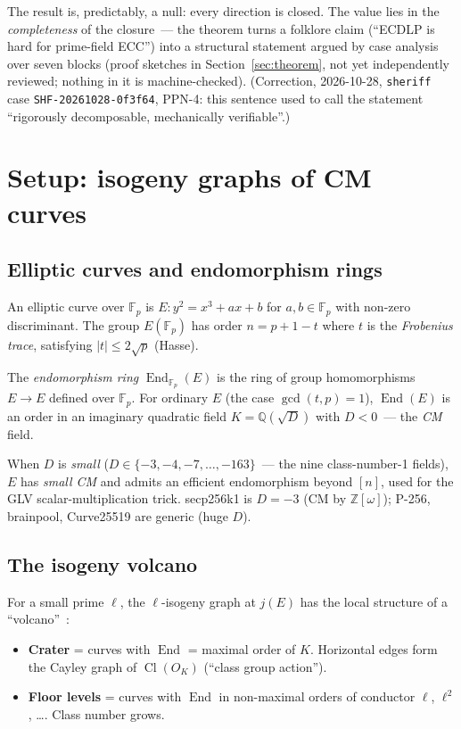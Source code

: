 \documentclass[11pt,a4paper]{article}
\theoremstyle{definition}
\newcommand{\FF}{\mathbb{F}}
\newcommand{\ZZ}{\mathbb{Z}}
\newcommand{\QQ}{\mathbb{Q}}
\newcommand{\End}{\operatorname{End}}
\newcommand{\Cl}{\operatorname{Cl}}
\renewcommand{\gcd}{\operatorname{gcd}}
\begin{document}
The result is, predictably, a null: every direction is closed.
The value lies in the \emph{completeness} of the closure~--- the
theorem turns a folklore claim (``ECDLP is hard for prime-field
ECC'') into a structural statement argued by case analysis over seven
blocks (proof sketches in Section~\ref{sec:theorem}, not yet
independently reviewed; nothing in it is machine-checked).
(Correction, 2026-10-28, \texttt{sheriff} case
\texttt{SHF-20261028-0f3f64}, PPN-4: this sentence used to call the
statement ``rigorously decomposable, mechanically verifiable''.)

\section{Setup: isogeny graphs of CM curves}

\subsection{Elliptic curves and endomorphism rings}

An elliptic curve over $\FF_p$ is $E\colon y^2 = x^3 + ax + b$ for
$a, b \in \FF_p$ with non-zero discriminant. The group $E(\FF_p)$
has order $n = p + 1 - t$ where $t$ is the \emph{Frobenius trace},
satisfying $|t| \leq 2\sqrt{p}$ (Hasse).

The \emph{endomorphism ring} $\End_{\FF_p}(E)$ is the ring of
group homomorphisms $E \to E$ defined over $\FF_p$. For ordinary
$E$ (the case $\gcd(t, p) = 1$), $\End(E)$ is an order in an
imaginary quadratic field $K = \QQ(\sqrt{D})$ with $D < 0$~---
the \emph{CM} field.

When $D$ is \emph{small} ($D \in \{-3, -4, -7, \ldots, -163\}$~---
the nine class-number-1 fields), $E$ has \emph{small CM} and
admits an efficient endomorphism beyond $[n]$, used for the GLV
scalar-multiplication trick. secp256k1 is $D = -3$ (CM by
$\ZZ[\omega]$); P-256, brainpool, Curve25519 are generic (huge $D$).

\subsection{The isogeny volcano}

For a small prime $\ell$, the $\ell$-isogeny graph at $j(E)$ has
the local structure of a ``volcano''~\cite{kohel1996,fouquetmorain2002}:

\begin{itemize}
\item \textbf{Crater} = curves with $\End$ = maximal order of $K$.
      Horizontal edges form the Cayley graph of $\Cl(O_K)$ (``class
      group action'').
\item \textbf{Floor levels} = curves with $\End$ in non-maximal
      orders of conductor $\ell$, $\ell^2$, \ldots. Class number
      grows.
\end{itemize}
\end{document}
